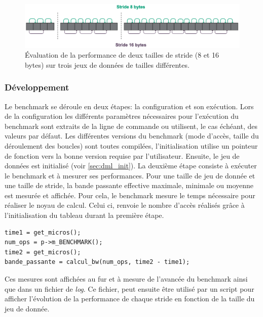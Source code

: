         \begin{figure}[h!]
        \center
        \includegraphics[width=14cm]{images/dml_stride_intro.png}
        \caption{\label{pic:dml_stride_intro}Évaluation de la performance de deux tailles de stride (8 et 16 bytes) sur trois jeux de données de tailles différentes.}
        \end{figure}

    
    \subsubsection{Développement}

        Le benchmark se déroule en deux étapes: la configuration et son exécution.
        Lors de la configuration les différents paramètres nécessaires pour l'exécution du benchmark sont extraits de la ligne de commande ou utilisent, le cas échéant, des valeurs par défaut. Les différentes versions du benchmark (mode d'accès, taille du déroulement des boucles) sont toutes compilées, l'initialisation utilise un pointeur de fonction vers la bonne version requise par l'utilisateur. Ensuite, le jeu de données est initialisé (voir \autoref{sec:dml_init}). 
        La deuxième étape consiste à exécuter le benchmark et à mesurer ses performances. Pour une taille de jeu de donnée et une taille de stride, la bande passante effective maximale, minimale ou moyenne est mesurée et affichée. Pour cela, le benchmark mesure le temps nécessaire pour réaliser le noyau de calcul. Celui ci, renvoie le nombre d'accès réalisés grâce à l'initialisation du tableau durant la première étape. 
            \begin{verbatim}
time1 = get_micros();
num_ops = p->m_BENCHMARK();
time2 = get_micros();
bande_passante = calcul_bw(num_ops, time2 - time1);
            \end{verbatim}
            
        Ces mesures sont affichées au fur et à mesure de l'avancée du benchmark ainsi que dans un fichier de \textit{log}. Ce fichier, peut ensuite être utilisé par un script pour afficher l'évolution de la performance de chaque stride en fonction de la taille du jeu de donnée. 
            

